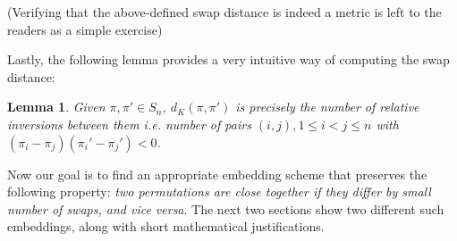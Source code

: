 \documentclass[10pt,journal,compsoc]{IEEEtran}
\newtheorem{lemma}[theorem]{Lemma}
\begin{document}
	(Verifying that the above-defined swap distance is indeed a metric is left to the readers as a simple exercise)
	
	Lastly, the following lemma provides a very intuitive way of computing the swap distance:
	\begin{lemma}
		Given $\pi, \pi' \in S_n$, $d_K(\pi, \pi')$ is precisely the number of relative inversions between them i.e. number of pairs $(i, j), 1 \leq i < j \leq n$ with $(\pi_i - \pi_j)(\pi_i' - \pi_j') < 0$.
	\end{lemma}
	
	Now our goal is to find an appropriate embedding scheme that preserves the following property: {\it two permutations are close together if they differ by small number of swaps, and vice versa}.
	The next two sections show two different such embeddings, along with short mathematical justifications.
	
\end{document}
